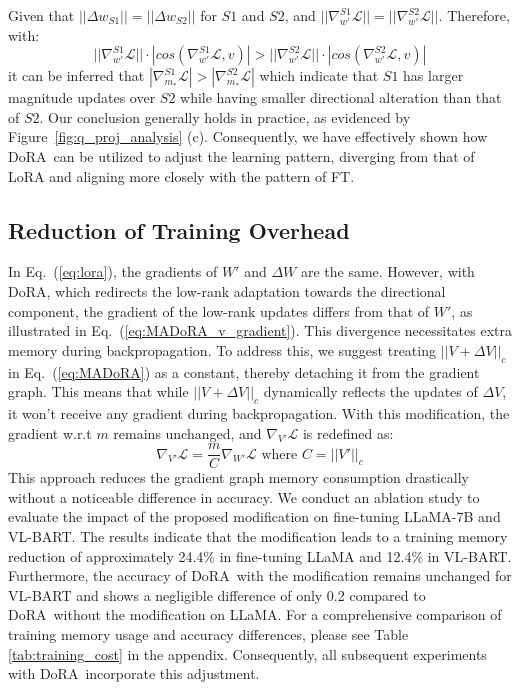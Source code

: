 \documentclass{article}
\newcommand{\ours}{DoRA}
\theoremstyle{plain}
\theoremstyle{definition}
\theoremstyle{remark}
\def\authornote#1#2#3{{\textcolor{#2}{\textsl{\small[#1: #3]}}}}
\newcommand{\PM}[1]{\authornote{Pavlo}{blue}{#1}}
\begin{document}
Given that $||\Delta w_{S1}|| = ||\Delta w_{S2}||$ for $S1$ and $S2$, and $||\nabla_{w'}^{S1} \mathcal{L}|| = ||\nabla_{w'}^{S2} \mathcal{L}||$. Therefore, with:
\begin{equation}
    ||\nabla_{w'}^{S1} \mathcal{L}|| \cdot |cos(\nabla_{w'}^{S1} \mathcal{L}, v)| > ||\nabla_{w'}^{S2} \mathcal{L}|| \cdot |cos(\nabla_{w'}^{S2} \mathcal{L}, v)|
\end{equation}
it can be inferred that $|\nabla_{m_{*}}^{S1} \mathcal{L}| > |\nabla_{m_{*}}^{S2} \mathcal{L}|$ which indicate that $S1$ has larger magnitude updates over $S2$ while having smaller directional alteration than that of $S2$. Our conclusion generally holds in practice, as evidenced by Figure~\ref{fig:q_proj_analysis} (c). Consequently, we have effectively shown how \ours~can be utilized to adjust the learning pattern, diverging from that of LoRA and aligning more closely with the pattern of FT.

\subsection{Reduction of Training Overhead}
In Eq.~(\ref{eq:lora}), the gradients of $W'$ and $\Delta W$ are the same. However, with \ours, which redirects the low-rank adaptation towards the directional component, the gradient of the low-rank updates differs from that of $W'$, as illustrated in Eq.~(\ref{eq:MADoRA_v_gradient}). This divergence necessitates extra memory during backpropagation. To address this, we suggest treating $||V + \Delta V||_{c}$ in Eq.~(\ref{eq:MADoRA}) as a constant, thereby detaching it from the gradient graph. This means that while $||V + \Delta V||_{c}$ dynamically reflects the updates of $\Delta V$, it won't receive any gradient during backpropagation. With this modification, the gradient w.r.t $m$ remains unchanged, and $\nabla_{V'} \mathcal{L}$ is redefined as:
\begin{equation}
\nabla_{V'} \mathcal{L} = \frac{m}{C} \nabla_{W'} \mathcal{L} \text{ where } C = ||V'||_{c}
\end{equation}
This approach reduces the gradient graph memory consumption drastically without a noticeable difference in accuracy. We conduct an ablation study to evaluate the impact of the proposed modification on fine-tuning LLaMA-7B and VL-BART. 
The results indicate that the modification leads to a training memory reduction of approximately 24.4\% in fine-tuning LLaMA and 12.4\% in VL-BART. Furthermore, the accuracy of \ours~with the modification remains unchanged for VL-BART and shows a negligible difference of only 0.2 compared to \ours~without the modification on LLaMA.
For a comprehensive comparison of training memory usage and accuracy differences, please see Table \ref{tab:training_cost} in the appendix. Consequently, all subsequent experiments with \ours~incorporate this adjustment. 
\end{document}
